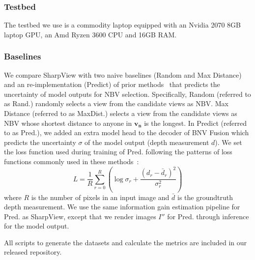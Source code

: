 \subsubsection{Testbed}
The testbed we use is a commodity laptop equipped with an Nvidia 2070 8GB laptop GPU, an Amd Ryzen 3600 CPU and 16GB RAM.

\subsubsection{Baselines}
We compare SharpView with two naive baselines (Random and Max Distance) and an re-implementation (Predict) of prior methods~\cite{shen_stochastic_2021,jin_neu-nbv_2023,ran_neurar_2023,avidan_activenerf_2022} that predicts the uncertainty of model outputs for NBV selection.
Specifically, Random (referred to as Rand.) randomly selects a view from the candidate views as NBV.
Max Distance (referred to as MaxDist.) selects a view from the candidate views as NBV whose shortest distance to anyone in $\bm{v_n}$ is the longest.
In Predict (referred to as Pred.), we added an extra model head to the decoder of BNV Fusion which predicts the uncertainty $\sigma$ of the model output (depth measurement $d$).
We set the loss function used during training of Pred. following the patterns of loss functions commonly used in these methods~\cite{shen_stochastic_2021,jin_neu-nbv_2023,ran_neurar_2023,avidan_activenerf_2022}: 
\begin{equation*}
    L = \frac{1}{R} \sum_{r=0}^R  (\log \sigma_r + \frac{(d_r-\bar{d}_r)^2}{\sigma_r^2})
\end{equation*}
where $R$ is the number of pixels in an input image and $\bar{d}$ is the groundtruth depth measurement.
We use the same information gain estimation pipeline for Pred. as SharpView, except that we render images $I''$ for Pred. through inference for the model output.

All scripts to generate the datasets and calculate the metrics are included in our released repository.

